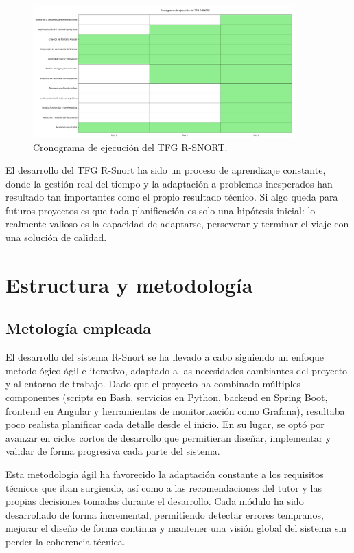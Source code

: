 \documentclass[11pt,a4paper,twoside]{report}
\begin{document}
\begin{figure}[H]
	\centering
	\includegraphics[width=0.9\textwidth]{cronologia/2.png}
	\caption{Cronograma de ejecución del TFG R-SNORT.}
	\label{fig:comparativa-tiempo}
\end{figure}

\newpage

El desarrollo del TFG R-Snort ha sido un proceso de aprendizaje constante, donde la gestión real del tiempo y la adaptación a problemas inesperados han resultado tan importantes como el propio resultado técnico. Si algo queda para futuros proyectos es que toda planificación es solo una hipótesis inicial: lo realmente valioso es la capacidad de adaptarse, perseverar y terminar el viaje con una solución de calidad.

\section{Estructura y metodología}

\subsection*{Metología empleada}

El desarrollo del sistema R-Snort se ha llevado a cabo siguiendo un enfoque metodológico ágil e iterativo, adaptado a las necesidades cambiantes del proyecto y al entorno de trabajo. Dado que el proyecto ha combinado múltiples componentes (scripts en Bash, servicios en Python, backend en Spring Boot, frontend en Angular y herramientas de monitorización como Grafana), resultaba poco realista planificar cada detalle desde el inicio. En su lugar, se optó por avanzar en ciclos cortos de desarrollo que permitieran diseñar, implementar y validar de forma progresiva cada parte del sistema.\newline

Esta metodología ágil ha favorecido la adaptación constante a los requisitos técnicos que iban surgiendo, así como a las recomendaciones del tutor y las propias decisiones tomadas durante el desarrollo. Cada módulo ha sido desarrollado de forma incremental, permitiendo detectar errores tempranos, mejorar el diseño de forma continua y mantener una visión global del sistema sin perder la coherencia técnica.\newline
\end{document}
